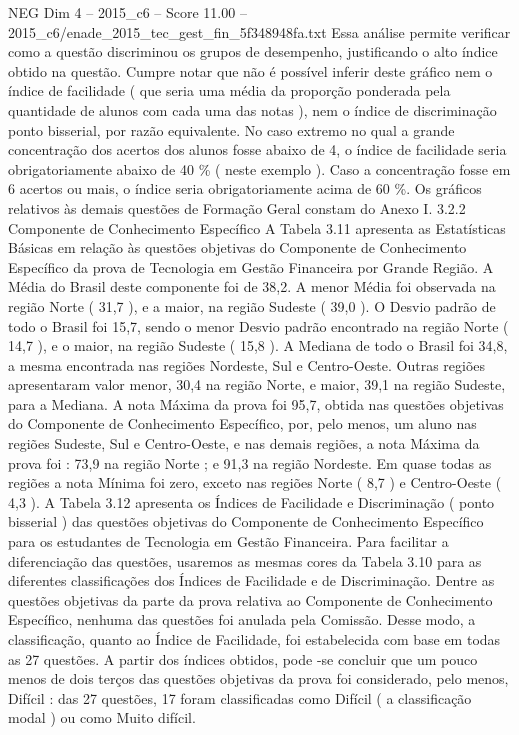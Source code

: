 \begin{textsample}{NEG Dim 4 – 2015\_c6 – Score 11.00 – 2015\_c6/enade\_2015\_tec\_gest\_fin\_5f348948fa.txt}
Essa análise permite verificar como a questão discriminou os grupos de desempenho, justificando o alto índice obtido na questão.
Cumpre notar que não é possível inferir deste gráfico nem o índice de facilidade ( que seria uma média da proporção ponderada pela quantidade de alunos com cada uma das notas ), nem o índice de discriminação ponto bisserial, por razão equivalente.
No caso extremo no qual a grande concentração dos acertos dos alunos fosse abaixo de 4, o índice de facilidade seria obrigatoriamente abaixo de 40 \% ( neste exemplo ).
Caso a concentração fosse em 6 acertos ou mais, o índice seria obrigatoriamente acima de 60 \%.
Os gráficos relativos às demais questões de Formação Geral constam do Anexo I. 3.2.2 Componente de Conhecimento Específico A Tabela 3.11 apresenta as Estatísticas Básicas em relação às questões objetivas do Componente de Conhecimento Específico da prova de Tecnologia em Gestão Financeira por Grande Região.
A Média do Brasil deste componente foi de 38,2.
A menor Média foi observada na região Norte ( 31,7 ), e a maior, na região Sudeste ( 39,0 ).
O Desvio padrão de todo o Brasil foi 15,7, sendo o menor Desvio padrão encontrado na região Norte ( 14,7 ), e o maior, na região Sudeste ( 15,8 ).
A Mediana de todo o Brasil foi 34,8, a mesma encontrada nas regiões Nordeste, Sul e Centro-Oeste.
Outras regiões apresentaram valor menor, 30,4 na região Norte, e maior, 39,1 na região Sudeste, para a Mediana.
A nota Máxima da prova foi 95,7, obtida nas questões objetivas do Componente de Conhecimento Específico, por, pelo menos, um aluno nas regiões Sudeste, Sul e Centro-Oeste, e nas demais regiões, a nota Máxima da prova foi : 73,9 na região Norte ; e 91,3 na região Nordeste.
Em quase todas as regiões a nota Mínima foi zero, exceto nas regiões Norte ( 8,7 ) e Centro-Oeste ( 4,3 ).
A Tabela 3.12 apresenta os Índices de Facilidade e Discriminação ( ponto bisserial ) das questões objetivas do Componente de Conhecimento Específico para os estudantes de Tecnologia em Gestão Financeira.
Para facilitar a diferenciação das questões, usaremos as mesmas cores da Tabela 3.10 para as diferentes classificações dos Índices de Facilidade e de Discriminação.
Dentre as questões objetivas da parte da prova relativa ao Componente de Conhecimento Específico, nenhuma das questões foi anulada pela Comissão.
Desse modo, a classificação, quanto ao Índice de Facilidade, foi estabelecida com base em todas as 27 questões.
A partir dos índices obtidos, pode -se concluir que um pouco menos de dois terços das questões objetivas da prova foi considerado, pelo menos, Difícil : das 27 questões, 17 foram classificadas como Difícil ( a classificação modal ) ou como Muito difícil.

\end{textsample}
